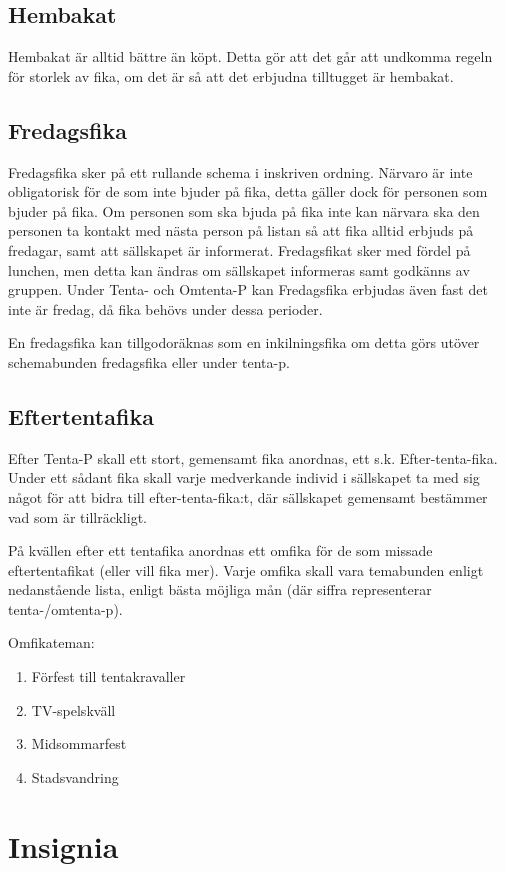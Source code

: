 \documentclass{article}
\begin{document}
\subsection{Hembakat}
Hembakat är alltid bättre än köpt. Detta gör att det går att undkomma regeln för
storlek av fika, om det är så att det erbjudna tilltugget är hembakat.

\subsection{Fredagsfika}
Fredagsfika sker på ett rullande schema i inskriven ordning. Närvaro är inte
obligatorisk för de som inte bjuder på fika, detta gäller dock för personen som
bjuder på fika. Om personen som ska bjuda på fika inte kan närvara ska den
personen ta kontakt med nästa person på listan så att fika alltid erbjuds på
fredagar, samt att sällskapet är informerat. Fredagsfikat sker med fördel på
lunchen, men detta kan ändras om sällskapet informeras samt godkänns av gruppen.
Under Tenta- och Omtenta-P kan Fredagsfika erbjudas även fast det inte är
fredag, då fika behövs under dessa perioder.

En fredagsfika kan tillgodoräknas som en inkilningsfika om detta görs utöver
schemabunden fredagsfika eller under tenta-p.

\subsection{Eftertentafika}
Efter Tenta-P skall ett stort, gemensamt fika anordnas, ett s.k.
Efter-tenta-fika. Under ett sådant fika skall varje medverkande individ i
sällskapet ta med sig något för att bidra till efter-tenta-fika:t, där
sällskapet gemensamt bestämmer vad som är tillräckligt.

På kvällen efter ett tentafika anordnas ett omfika för de som missade
eftertentafikat (eller vill fika mer). Varje omfika skall vara temabunden enligt
nedanstående lista, enligt bästa möjliga mån (där siffra representerar
tenta-/omtenta-p).

Omfikateman:
\begin{enumerate}
  \item Förfest till tentakravaller
  \item TV-spelskväll
  \item Midsommarfest
  \item Stadsvandring
\end{enumerate}

\section{Insignia}
\end{document}
